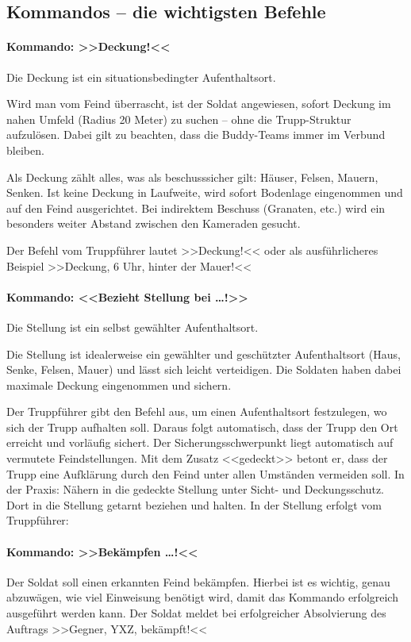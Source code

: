 \subsection{Kommandos -- die wichtigsten Befehle}
\label{sec:kommando}
\medskip %
\paragraph*{Kommando: >>Deckung!<<}
	Die Deckung ist ein situationsbedingter Aufenthaltsort.	\par
	Wird man vom Feind überrascht, ist der Soldat angewiesen, sofort Deckung im nahen Umfeld (Radius 20 Meter) zu suchen – ohne die Trupp-Struktur aufzulösen. Dabei gilt zu beachten, dass die Buddy-Teams immer im Verbund bleiben.\par
	Als Deckung zählt alles, was als beschusssicher gilt: Häuser, Felsen, Mauern, Senken. Ist keine Deckung in Laufweite, wird sofort Bodenlage eingenommen und auf den Feind ausgerichtet. Bei indirektem Beschuss (Granaten, etc.) wird ein besonders weiter Abstand zwischen den Kameraden gesucht.
	\par\medskip
	Der Befehl vom Truppführer lautet >>Deckung!<< oder als ausführlicheres Beispiel >>Deckung, 6 Uhr, hinter der Mauer!<<

\paragraph*{Kommando: <<Bezieht Stellung bei \dots!>>}
	Die Stellung ist ein selbst gewählter Aufenthaltsort.\par
	Die Stellung ist idealerweise ein gewählter und geschützter Aufenthaltsort (Haus, Senke, Felsen, Mauer) und lässt sich leicht verteidigen. Die Soldaten haben dabei maximale Deckung eingenommen und sichern.\par
	Der Truppführer gibt den Befehl aus, um einen Aufenthaltsort festzulegen, wo sich der Trupp aufhalten soll. Daraus folgt automatisch, dass der Trupp den Ort erreicht und vorläufig sichert. Der Sicherungsschwerpunkt liegt automatisch auf vermutete Feindstellungen. Mit dem Zusatz <<gedeckt>> betont er, dass der Trupp eine Aufklärung durch den Feind unter allen Umständen vermeiden soll. In der Praxis: Nähern in die gedeckte Stellung unter Sicht- und Deckungsschutz. Dort in die Stellung getarnt beziehen und halten. In der Stellung erfolgt vom Truppführer:

\paragraph*{Kommando: >>Bekämpfen \dots!<<}
	Der Soldat soll einen erkannten Feind bekämpfen. Hierbei ist es wichtig, genau abzuwägen, wie viel Einweisung benötigt wird, damit das Kommando erfolgreich ausgeführt werden kann. Der Soldat meldet bei erfolgreicher Absolvierung des Auftrags >>Gegner, YXZ, bekämpft!<<

